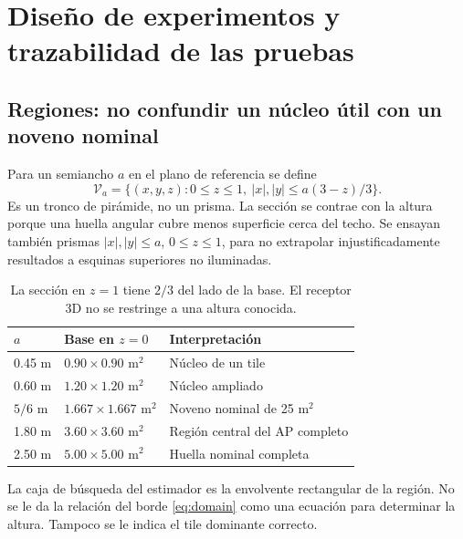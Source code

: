 \section{Diseño de experimentos y trazabilidad de las pruebas}
\subsection{Regiones: no confundir un núcleo útil con un noveno nominal}
Para un semiancho $a$ en el plano de referencia se define
\begin{equation}\label{eq:domain}
\mathcal V_a=\{(x,y,z):0\le z\le1,\ |x|,|y|\le a(3-z)/3\}.
\end{equation}
Es un tronco de pirámide, no un prisma. La sección se contrae con la altura porque una huella angular cubre menos superficie cerca del techo. Se ensayan también prismas $|x|,|y|\le a$, $0\le z\le1$, para no extrapolar injustificadamente resultados a esquinas superiores no iluminadas.

\begin{table}[H]\centering\begin{tabular}{lll}\toprule
$a$ & Base en $z=0$ & Interpretación\\\midrule
0.45 m & $0.90\times0.90$ m$^2$ & Núcleo de un tile\\
0.60 m & $1.20\times1.20$ m$^2$ & Núcleo ampliado\\
$5/6$ m & $1.667\times1.667$ m$^2$ & Noveno nominal de 25 m$^2$\\
1.80 m & $3.60\times3.60$ m$^2$ & Región central del AP completo\\
2.50 m & $5.00\times5.00$ m$^2$ & Huella nominal completa\\\bottomrule
\end{tabular}\caption{La sección en $z=1$ tiene $2/3$ del lado de la base. El receptor 3D no se restringe a una altura conocida.}\end{table}

La caja de búsqueda del estimador es la envolvente rectangular de la región. No se le da la relación del borde \eqref{eq:domain} como una ecuación para determinar la altura. Tampoco se le indica el tile dominante correcto.

